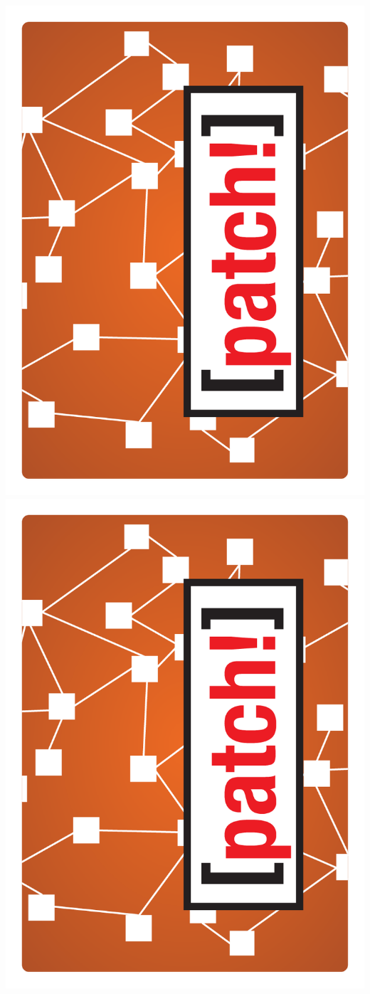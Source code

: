\documentclass{letter}
\begin{document}
\includegraphics{backs/back_patch}
\includegraphics{backs/back_patch}
\end{document}
